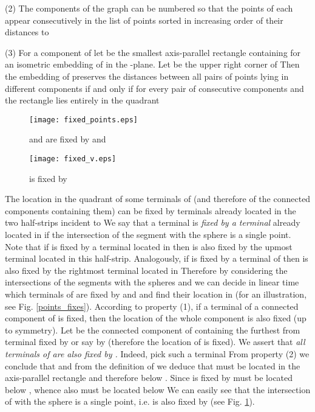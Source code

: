 \documentclass[11pt]{amsart}
\begin{document}
\medskip\noindent
(2) The components  of the graph  can be numbered so that the
points of each  appear consecutively in the list of points  
sorted in increasing order of their distances  to 

\medskip\noindent
(3) For a component  of  let  be the smallest
axis-parallel rectangle containing  for an isometric embedding 
of  in the -plane. Let  be the upper right corner
of  Then the embedding of  preserves
the distances between all pairs of points lying in different
components if and only if for every pair of consecutive components
 and  the rectangle  lies entirely in the
quadrant 

\begin{figure}
    \begin{minipage}[b]{.48\linewidth}
        \centering
        \texttt{[image: fixed\_points.eps]}
        \caption{ and  are fixed by  and }
        \label{points_fixes}
    \end{minipage} \hfill
    \begin{minipage}[b]{.48\linewidth}
        \centering
        \texttt{[image: fixed\_v.eps]}
        \caption{ is fixed by }
        \label{fixe_v}
    \end{minipage}
\end{figure}


\medskip
The location in the quadrant  of some terminals of  (and
therefore of the connected components containing them) can be fixed
by terminals already located in the two half-strips incident to
 We say that a terminal  is {\it fixed by a
terminal}  already located in  if the intersection
of the segment  with the sphere  is a
single point. Note that if  is fixed by a terminal located
in  then  is also fixed by the upmost terminal 
located in this half-strip. Analogously, if  is fixed by a
terminal of   then  is also fixed by the rightmost terminal
 located in  Therefore by considering the intersections
of the segments  with the spheres
 and  we can
decide in linear time which terminals of  are fixed by 
and  and find their location in  (for an illustration, see
Fig. \ref{points_fixes}). According to property (1), if a terminal
of a connected component of  is fixed, then the location of the
whole component is also fixed (up to symmetry).  Let  be the
connected component of  containing the furthest from 
terminal  fixed by  or  say by  (therefore
the location of  is fixed). We assert that {\it  all terminals
of  are also fixed by .} Indeed, pick
such a terminal  From property (2) we conclude that  and from the definition of  we deduce that  must
be located in the axis-parallel rectangle  and
therefore below . Since  is fixed by   must be
located below , whence  also must be located below  We
can easily see that the intersection of  with the sphere
 is a single point, i.e.  is also fixed
by   (see Fig. \ref{fixe_v}).
\end{document}
